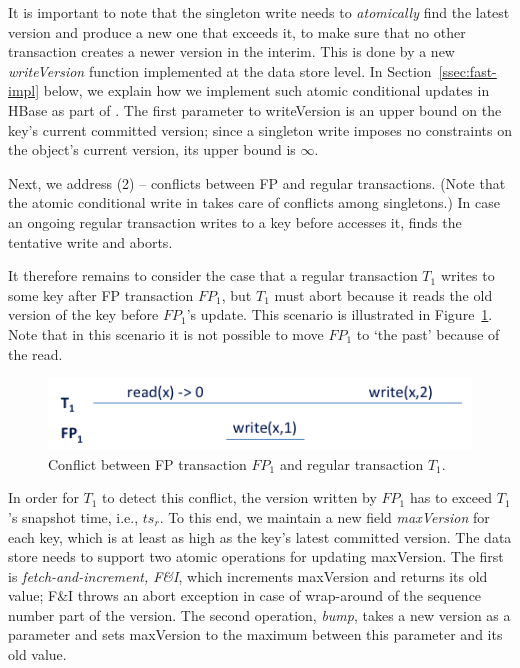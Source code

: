 It is important to note that the singleton write needs to \emph{atomically} find the latest version and produce a new one that exceeds it, 
to make sure that no other transaction creates a newer version in the interim. This is done by a new \emph{writeVersion} function implemented 
at the data store level. In Section~\ref{ssec:fast-impl}
below, we explain how we implement such atomic conditional updates in HBase as part of \sys. 
The first parameter to writeVersion is an upper bound on the key's current committed version; since a singleton write
imposes no constraints on the object's current version, its upper bound is $\infty$.

Next, we address (2) -- conflicts between FP and regular transactions.
(Note that the atomic conditional write in  takes care of conflicts among singletons.)
In case an ongoing regular transaction writes to a key before  accesses it, 
 finds the tentative write and aborts. 

It therefore remains to consider the case that
a regular transaction $T_1$ writes to some key after FP transaction $FP_1$, but $T_1$ must abort because
it reads the old version of the key before $FP_1$'s update. This scenario is illustrated in Figure~\ref{fig:why-bump}. 
Note that in this scenario it is not possible to move $FP_1$ to `the past' because of the read.

\begin{figure}[htb]
\includegraphics[width=\columnwidth]{figs/FP-why-bump}
\caption{Conflict between FP transaction $FP_1$ and regular transaction $T_1$.}
\label{fig:why-bump}
\end{figure}

In order for $T_1$ to detect this 
conflict, the version written by $FP_1$ has to exceed $T_1$'s snapshot time, i.e., $ts_r$.
To this end, we maintain a new field \emph{maxVersion} for each key, which is at least as 
high as the key's latest committed version. 
The data store needs to support two atomic operations for updating {maxVersion}.
The first is \emph{fetch-and-increment, F\&I}, which increments {maxVersion} and returns its
old value; F\&I throws an abort exception in case of wrap-around of the 
sequence number part  of  the version. 
The second operation, \emph{bump}, takes a new version  as a parameter and
sets  {maxVersion} to the maximum between this parameter and its old value.

